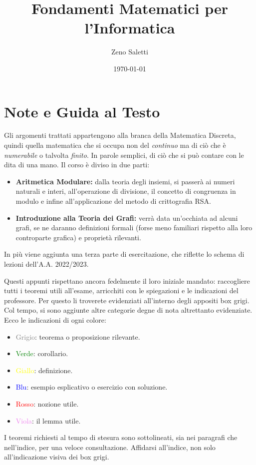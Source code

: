 \documentclass[oneside]{book}
\title{Fondamenti Matematici per l'Informatica}
\author{Zeno Saletti}
\date{\today}
\theoremstyle{remark}
\begin{document}
\begin{titlepage}
\maketitle
\end{titlepage}


\section*{Note e Guida al Testo}
Gli argomenti trattati appartengono alla branca della Matematica Discreta,
quindi quella matematica che si occupa non del \textit{continuo} ma di
ciò che è \textit{numerabile} o talvolta \textit{finito}. In parole
semplici, di ciò che si può contare con le dita di una mano. Il corso
è diviso in due parti:
\begin{itemize}
\item \textbf{Aritmetica Modulare:} dalla teoria degli insiemi,
si passerà ai numeri naturali e interi, all'operazione di divisione,
il concetto di congruenza in modulo e infine all'applicazione
del metodo di crittografia RSA.

\item \textbf{Introduzione alla Teoria dei Grafi:} verrà data un'occhiata
ad alcuni grafi, se ne daranno definizioni formali (forse meno familiari
rispetto alla loro controparte grafica) e proprietà rilevanti.
\end{itemize}
In più viene aggiunta una terza parte di esercitazione, che riflette
lo schema di lezioni dell'A.A. 2022/2023.

Questi appunti rispettano ancora fedelmente il loro iniziale mandato:
raccogliere tutti i teoremi utili all'esame, arricchiti con le spiegazioni
e le indicazioni del professore. Per questo li troverete evidenziati
all'interno degli appositi box grigi. Col tempo, si sono aggiunte altre
categorie degne di nota altrettanto evidenziate. Ecco le indicazioni di ogni
colore:
\begin{itemize}
\item \textcolor{gray}{Grigio}: teorema o proposizione rilevante.
\item \textcolor{green}{Verde}: corollario.
\item \textcolor{yellow}{Giallo}: definizione.
\item \textcolor{blue}{Blu}: esempio esplicativo o esercizio con soluzione.
\item \textcolor{red}{Rosso}: nozione utile.
\item \textcolor{violet}{Viola}: il lemma utile.
\end{itemize}
I teoremi richiesti al tempo di stesura sono sottolineati, sia
nei paragrafi che nell'indice, per una veloce consultazione.
Affidarsi all'indice, non solo all'indicazione visiva dei box
grigi.
\end{document}
